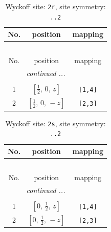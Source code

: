 \documentclass[fleqn,8pt]{jsarticle}
\begin{document}
\renewcommand{\arraystretch}{1.2}
\begin{longtable}{ccc}
\caption{Wyckoff site: {\tt 2r}, site symmetry: {\tt ..2}}
 \\
 \hline \hline
No. & position & mapping \\ \hline \endfirsthead

\multicolumn{2}{l}{\tablename\ \thetable{}} \\
 \hline \hline
No. & position & mapping \\ \hline \endhead

 \hline \hline
\multicolumn{2}{r}{\footnotesize\it continued ...} \\ \endfoot

 \hline \hline
\multicolumn{2}{r}{} \\ \endlastfoot

1 & $\left[ \frac{1}{2},\, 0,\, z \right]$ & {\tt [1,4]} \\ \hline
2 & $\left[ \frac{1}{2},\, 0,\, - z \right]$ & {\tt [2,3]} \\
\end{longtable}
\renewcommand{\arraystretch}{1.2}
\begin{longtable}{ccc}
\caption{Wyckoff site: {\tt 2s}, site symmetry: {\tt ..2}}
 \\
 \hline \hline
No. & position & mapping \\ \hline \endfirsthead

\multicolumn{2}{l}{\tablename\ \thetable{}} \\
 \hline \hline
No. & position & mapping \\ \hline \endhead

 \hline \hline
\multicolumn{2}{r}{\footnotesize\it continued ...} \\ \endfoot

 \hline \hline
\multicolumn{2}{r}{} \\ \endlastfoot

1 & $\left[ 0,\, \frac{1}{2},\, z \right]$ & {\tt [1,4]} \\ \hline
2 & $\left[ 0,\, \frac{1}{2},\, - z \right]$ & {\tt [2,3]} \\
\end{longtable}
\renewcommand{\arraystretch}{1.2}
\end{document}
